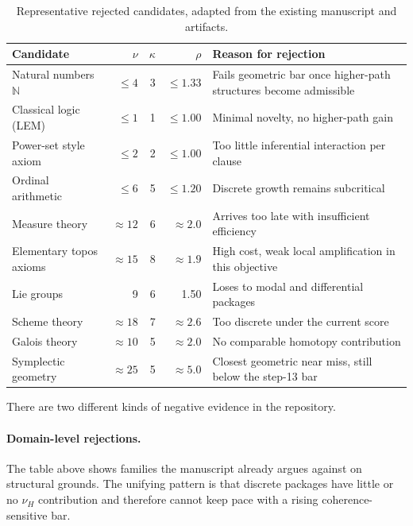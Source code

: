 \documentclass[11pt,a4paper]{article}
\newcommand{\N}{\mathbb{N}}
\begin{document}
\begin{table}[H]
\centering
\caption{Representative rejected candidates, adapted from the existing manuscript and artifacts.}
\label{tab:rejected}
\small
\begin{tabular}{@{}l r r r l@{}}
\toprule
Candidate & $\nu$ & $\kappa$ & $\rho$ & Reason for rejection \\
\midrule
Natural numbers $\N$ & $\leq 4$ & 3 & $\leq 1.33$ & Fails geometric bar once higher-path structures become admissible \\
Classical logic (LEM) & $\leq 1$ & 1 & $\leq 1.00$ & Minimal novelty, no higher-path gain \\
Power-set style axiom & $\leq 2$ & 2 & $\leq 1.00$ & Too little inferential interaction per clause \\
Ordinal arithmetic & $\leq 6$ & 5 & $\leq 1.20$ & Discrete growth remains subcritical \\
Measure theory & $\approx 12$ & 6 & $\approx 2.0$ & Arrives too late with insufficient efficiency \\
Elementary topos axioms & $\approx 15$ & 8 & $\approx 1.9$ & High cost, weak local amplification in this objective \\
Lie groups & 9 & 6 & 1.50 & Loses to modal and differential packages \\
Scheme theory & $\approx 18$ & 7 & $\approx 2.6$ & Too discrete under the current score \\
Galois theory & $\approx 10$ & 5 & $\approx 2.0$ & No comparable homotopy contribution \\
Symplectic geometry & $\approx 25$ & 5 & $\approx 5.0$ & Closest geometric near miss, still below the step-13 bar \\
\bottomrule
\end{tabular}
\end{table}

There are two different kinds of negative evidence in the repository.

\paragraph{Domain-level rejections.}
The table above shows families the manuscript already argues against on structural grounds. The unifying pattern is that discrete packages have little or no $\nu_H$ contribution and therefore cannot keep pace with a rising coherence-sensitive bar.
\end{document}
